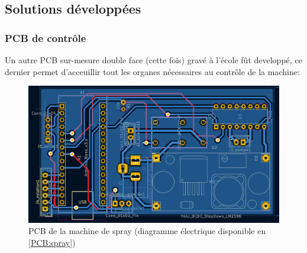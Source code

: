 \newpage
\subsection{Solutions développées}
\subsubsection{PCB de contrôle}
Un autre PCB sur-mesure double face (cette fois) gravé à l'école fût developpé, ce dernier permet d'acceuillir tout les organes
nécessaires au contrôle de la machine:
\begin{figure}[H]
    \centering
    \includegraphics[width = \textwidth]{assets/figures/ameliorations/PCB_spray_kicad.png}
    \caption{PCB de la machine de spray (diagramme électrique disponible en \autoref{PCB:spray})}
\end{figure}

\newpage


